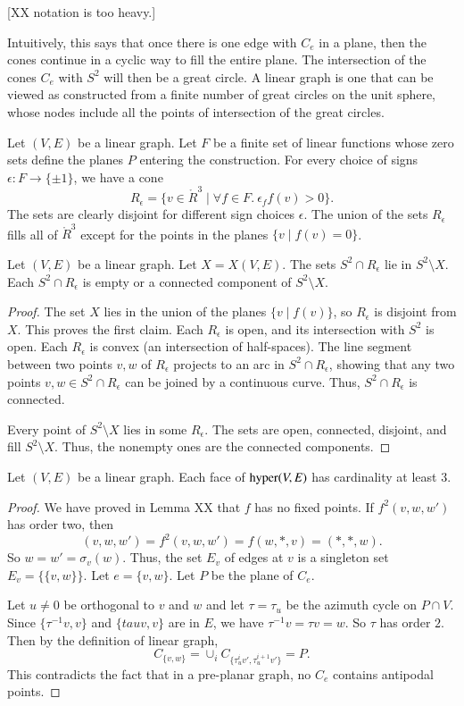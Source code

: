 [XX notation is too heavy.]

Intuitively, this says that once there is one edge with $C_e$ in a
plane, then the cones continue in a cyclic way to fill the entire
plane. The intersection of the cones $C_e$ with $S^2$ will then be a
great circle.  A linear graph is one that can be viewed as
constructed from a finite number of great circles on the unit
sphere, whose nodes include all the points of intersection of the
great circles.

Let $(V,E)$ be a linear graph.   Let $F$ be a finite set of linear
functions whose zero sets define the planes $P$ entering the
construction. For every choice of signs $\epsilon: F\to \{\pm 1\}$,
we have a cone
    $$R_\epsilon = \{v\in\ring{R}^3 \mid \forall f\in F.\ \epsilon_f f(v) > 0\}.$$
The sets are clearly disjoint for different sign choices $\epsilon$.
The union of the sets $R_\epsilon$ fills all of $\ring{R}^3$ except
for the points in the planes $\{v\mid f(v)=0\}$.


\begin{lemma} Let $(V,E)$ be a linear graph.  Let $X=X(V,E)$.
The sets $S^2\cap
R_\epsilon$ lie in $S^2\setminus X$.  Each $S^2\cap R_\epsilon$ is
empty or a connected component of $S^2\setminus X$.
\end{lemma}

\begin{proof}  The set $X$ lies in the union of the planes $\{v\mid
f(v)\}$, so $R_\epsilon$ is disjoint from $X$.  This proves the
first claim.  Each $R_\epsilon$ is open, and its intersection with
$S^2$ is open.  Each $R_\epsilon$ is convex (an intersection of
half-spaces).  The line segment between two points $v,w$ of
$R_\epsilon$ projects to an arc in $S^2\cap R_\epsilon$, showing
that any two points $v,w\in S^2\cap R_\epsilon$ can be joined by a
continuous curve.  Thus, $S^2\cap R_\epsilon$ is connected.

Every point of $S^2\setminus X$ lies in some $R_\epsilon$.  The sets
are open, connected, disjoint, and fill $S^2\setminus X$. Thus, the
nonempty ones are the connected components.
\end{proof}

\begin{lemma} Let $(V,E)$ be a linear graph.  Each face of
${\operatorname{hyper}}(V,E)$ has cardinality at least $3$.
\end{lemma}

\begin{proof} We have proved in Lemma XX that $f$ has no fixed
points.  If $f^2 (v,w,w')$ has order two, then
    $$(v,w,w') = f^2(v,w,w') = f(w,*,v) = (*,*,w).$$
So $w=w'=\sigma_v(w)$.  Thus, the set $E_v$ of edges at $v$ is a
singleton set $E_v = \{\{v,w\}\}$.  Let $e=\{v,w\}$.  Let $P$ be the
plane of $C_e$.

Let $u\ne0$ be orthogonal to $v$ and $w$ and let $\tau=\tau_u$ be
the azimuth cycle on $P\cap V$.  Since $\{\tau^{-1}v,v\}$ and $\{tau
v,v\}$ are in $E$, we have $\tau^{-1}v = \tau v = w$.  So $\tau$ has
order $2$.  Then by the definition of linear graph,
  $$C_{\{v,w\}} = \cup_{i} C_{\{\tau_u^i v',\tau_u^{i+1} v'\}} = P.$$
This contradicts the fact that in a pre-planar graph, no $C_e$
contains antipodal points.
\end{proof}

